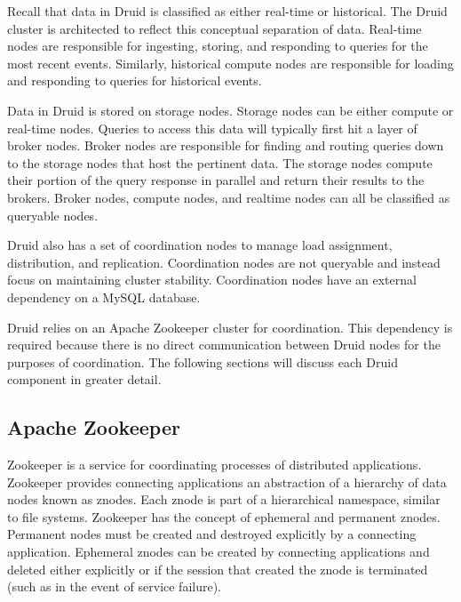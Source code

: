 \documentclass{vldb}
\begin{document}
Recall that data in Druid is classified as either real-time or
historical. The Druid cluster is architected to reflect this
conceptual separation of data. Real-time nodes are responsible for
ingesting, storing, and responding to queries for the most recent
events. Similarly, historical compute nodes are responsible for
loading and responding to queries for historical events.

Data in Druid is stored on storage nodes. Storage nodes can be either
compute or real-time nodes.  Queries to access this data will
typically first hit a layer of broker nodes. Broker nodes are
responsible for finding and routing queries down to the storage nodes
that host the pertinent data. The storage nodes compute their portion
of the query response in parallel and return their results to the
brokers. Broker nodes, compute nodes, and realtime nodes can all be
classified as queryable nodes.

Druid also has a set of coordination nodes to manage load assignment,
distribution, and replication. Coordination nodes are not queryable
and instead focus on maintaining cluster stability. Coordination nodes
have an external dependency on a MySQL database.

Druid relies on an Apache Zookeeper \cite{hunt2010zookeeper} cluster
for coordination. This dependency is required because there is no
direct communication between Druid nodes for the purposes of coordination. The
following sections will discuss each Druid component in greater
detail.

\subsection{Apache Zookeeper}
Zookeeper is a service for coordinating processes of distributed
applications. Zookeeper provides connecting applications an
abstraction of a hierarchy of data nodes known as znodes. Each znode
is part of a hierarchical namespace, similar to file
systems. Zookeeper has the concept of ephemeral and permanent
znodes. Permanent nodes must be created and destroyed explicitly by a
connecting application. Ephemeral znodes can be created by connecting
applications and deleted either explicitly or if the session that
created the znode is terminated (such as in the event of service
failure).
\end{document}
